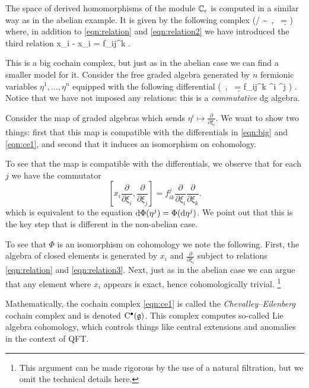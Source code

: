 \documentclass[11pt]{amsart}
\begin{document}
The space of derived homomorphisms of the module $\mathbb C_\epsilon$ is computed in a similar way as in the abelian example. 
It is given by the following complex 
\beqn
\label{eqn:big}
\left(\CC{} / \sim \, , \, \d =  \right) 
\eeqn
where, in addition to \eqref{eqn:relation} and \eqref{eqn:relation2} we have introduced the third relation
\beqn \label{eqn:relation3}
x_i  -  x_i = f_{ij}^k  .
\eeqn

This is a big cochain complex, but just as in the abelian case we can find a smaller model for it.
Consider the free graded algebra generated by $n$ fermionic variables $\eta^1, \ldots, \eta^n$ equipped with the following differential
\beqn\label{eqn:ce1}
\left(\CC[\eta^i] \, , \, \d =  f_{ij}^k \eta^i \eta^j   \right) .
\eeqn
Notice that we have not imposed any relations: this is a {\em commutative} dg algebra.

Consider the map of graded algebras
\beqn\label{eqn:quasi1}
\Phi \colon \CC[\eta^i] \to \CC{}
\eeqn
which sends $\eta^i \mapsto  \frac{\partial}{\partial \xi_i}$. 
We want to show two things: first that this map is compatible with the differentials in \eqref{eqn:big} and \eqref{eqn:ce1}, and second that it induces an isomorphism on cohomology.

To see that the map is compatible with the differentials, we observe that for each $j$ we have the commutator
\[
\left[x_i \frac{\partial}{\partial \xi_i} , \frac{\partial}{\partial \xi_j}\right] = f^j_{ik} \frac{\partial}{\partial \xi_i} \frac{\partial}{\partial \xi_k} .
\]
which is equivalent to the equation ${\rm d} \Phi(\eta^j) =\Phi ({\rm d} \eta^j)$. 
We point out that this is the key step that is different in the non-abelian case. 

To see that $\Phi$ is an isomorphism on cohomology we note the following. 
First, the algebra of closed elements is generated by $x_i$ and $\frac{\partial}{\partial \xi_i}$ subject to relations \eqref{eqn:relation} and \eqref{eqn:relation3}.
Next, just as in the abelian case we can argue that any element where $x_i$ appears is exact, hence cohomologically trivial. 
\footnote{This argument can be made rigorous by the use of a natural filtration, but we omit the technical details here.}  

Mathematically, the cochain complex \eqref{eqn:ce1} is called the {\em Chevalley--Eilenberg} cochain complex and is denoted ${\rm C}^\bullet(\mathfrak g)$. 
This complex computes so-called Lie algebra cohomology, which controls things like central extensions and anomalies in the context of QFT. 
\end{document}
